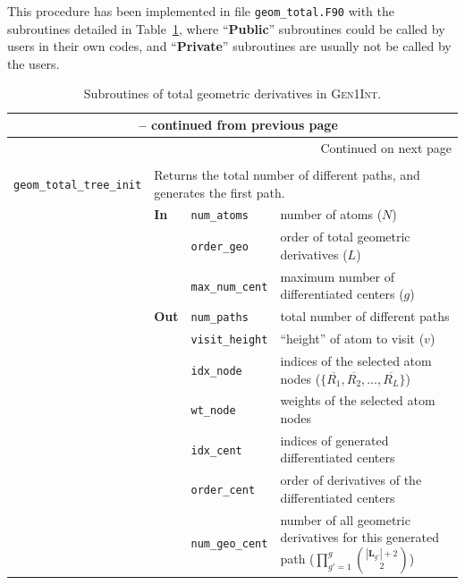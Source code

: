 \documentclass[a4paper,11pt,twoside,openright]{book}
\begin{document}
This procedure has been implemented in file \verb|geom_total.F90| with the subroutines detailed
in Table~\ref{tab:geom-total}, where ``\textbf{Public}'' subroutines could be called by users in their
own codes, and ``\textbf{Private}'' subroutines are usually not be called by the users.
\begin{center}
  \begin{longtable}{l|p{1.1cm}|p{2.3cm}p{7.6cm}}
    \caption{Subroutines of total geometric derivatives in \textsc{Gen1Int}.}
    \label{tab:geom-total}\\
    \hline\hline
    \endfirsthead
%
    \multicolumn{4}{c}{{\bfseries\tablename~\thetable{} -- continued from previous page}}\\
    \hline\hline
    \endhead
%
    \hline
    \multicolumn{4}{r}{{Continued on next page}}\\
    \hline
    \endfoot
%
    \hline\hline
    \endlastfoot
%
    \multicolumn{4}{l}{\textbf{Public}}\\
    \hline
    \verb|geom_total_tree_init|\index{\textsl{public} \texttt{geom\_total\_tree\_init}} & %
      \multicolumn{3}{p{11cm}}{Returns the total number of different paths, and generates the first path.}\\
    \cline{2-4}
    & \textbf{In} & \verb|num_atoms| & number of atoms ($N$)\\
    \cline{3-4}
    & & \verb|order_geo| & order of total geometric derivatives ($L$)\\
    \cline{3-4}
    & & \verb|max_num_cent| & maximum number of differentiated centers ($g$)\\
    \cline{2-4}
    & \textbf{Out} & \verb|num_paths| & total number of different paths\\
    \cline{3-4}
    & & \verb|visit_height| & ``height'' of atom to visit ($v$)\\
    \cline{3-4}
    & & \verb|idx_node| & indices of the selected atom nodes ($\{\overline{R_{1}},\overline{R_{2}},\dots,\overline{R_{L}}\}$)\\
    \cline{3-4}
    & & \verb|wt_node| & weights of the selected atom nodes\\
    \cline{3-4}
    & & \verb|idx_cent| & indices of generated differentiated centers\\
    \cline{3-4}
    & & \verb|order_cent| & order of derivatives of the differentiated centers\\
    \cline{3-4}
    & & \verb|num_geo_cent| & number of all geometric derivatives for this generated path %
      ($\prod_{g'=1}^{g}\binom{|\boldsymbol{L}_{g'}|+2}{2}$)\\

\end{longtable}
\end{center}
\end{document}

